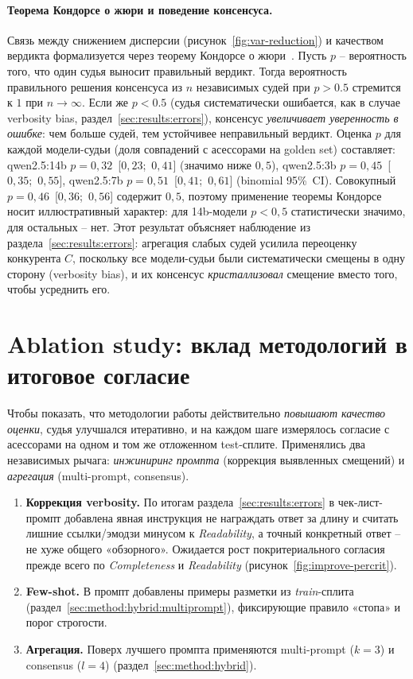 \paragraph{Теорема Кондорсе о жюри и поведение консенсуса.}
Связь между снижением дисперсии (рисунок~\ref{fig:var-reduction}) и качеством вердикта формализуется через теорему Кондорсе о жюри~\cite{condorcet1785essay}. Пусть $p$ -- вероятность того, что один судья выносит правильный вердикт. Тогда вероятность правильного решения консенсуса из $n$ независимых судей при $p > 0.5$ стремится к $1$ при $n \to \infty$. Если же $p < 0.5$ (судья систематически ошибается, как в случае verbosity bias, раздел~\ref{sec:results:errors}), консенсус \emph{увеличивает уверенность в ошибке}: чем больше судей, тем устойчивее неправильный вердикт.
Оценка $p$ для каждой модели-судьи (доля совпадений с асессорами
на golden set) составляет: qwen2.5:14b $p = 0{,}32$~[$0{,}23$;~$0{,}41$]
(значимо ниже $0{,}5$), qwen2.5:3b $p = 0{,}45$~[$0{,}35$;~$0{,}55$],
qwen2.5:7b $p = 0{,}51$~[$0{,}41$;~$0{,}61$] (binomial 95\%~CI).
Совокупный $p = 0{,}46$~[$0{,}36$;~$0{,}56$] содержит $0{,}5$,
поэтому применение теоремы Кондорсе носит иллюстративный характер:
для 14b-модели $p < 0{,}5$ статистически значимо, для остальных --
нет.
Этот результат объясняет наблюдение из раздела~\ref{sec:results:errors}: агрегация слабых судей усилила переоценку конкурента $C$, поскольку все модели-судьи были систематически смещены в одну сторону (verbosity bias), и их консенсус \emph{кристаллизовал} смещение вместо того, чтобы усреднить его.

\section{Ablation study: вклад методологий в итоговое согласие}
\label{sec:results:improve}

Чтобы показать, что методологии работы действительно \emph{повышают
качество оценки}, судья улучшался итеративно, и на каждом шаге измерялось
согласие с асессорами на одном и том же отложенном test-сплите.
Применялись два независимых рычага: \emph{инжиниринг промпта} (коррекция
выявленных смещений) и \emph{агрегация} (multi-prompt, consensus).

\begin{enumerate}
    \item \textbf{Коррекция verbosity.} По итогам
        раздела~\ref{sec:results:errors} в чек-лист-промпт добавлена явная
        инструкция не награждать ответ за длину и считать лишние
        ссылки/эмодзи минусом к \emph{Readability}, а точный конкретный
        ответ -- не хуже общего «обзорного». Ожидается рост
        покритериального согласия прежде всего по \emph{Completeness} и
        \emph{Readability} (рисунок~\ref{fig:improve-percrit}).
    \item \textbf{Few-shot.} В промпт добавлены примеры разметки из
        \emph{train}-сплита (раздел~\ref{sec:method:hybrid:multiprompt}),
        фиксирующие правило «стопа» и порог строгости.
    \item \textbf{Агрегация.} Поверх лучшего промпта применяются
        multi-prompt ($k=3$) и consensus ($l=4$)
        (раздел~\ref{sec:method:hybrid}).
\end{enumerate}

